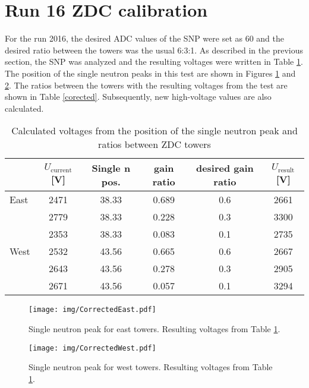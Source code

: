 \section{Run 16 ZDC calibration}
For the run 2016, the desired ADC values of the SNP were set as 60 and the desired ratio between the
towers was the usual 6:3:1. As described in the previous section, the SNP was analyzed
and the resulting voltages were written in Table \ref{uncorected}. The position of the single
neutron peaks in this test
are shown in Figures \ref{eastPlot} and \ref{westPlot}.
The ratios between the towers with the resulting voltages from the test
are shown in Table \ref{corected}.
Subsequently, new high-voltage values are also calculated.

\begin{table}[htb] 
\caption{Calculated voltages from the position of the single neutron peak and ratios 
between ZDC towers}
\label{uncorected}
\begin{center}
\begin{tabular}{lccccc}
 \toprule
 &$U_\text{current}$[V]&Single n pos.&gain ratio&desired gain ratio&$U_\text{result}$[V]\\
\midrule
 East&2471&38.33&0.689&0.6&2661\\
     &2779&38.33&0.228&0.3&3300\\
     &2353&38.33&0.083&0.1&2735\\
 \midrule
West&2532&43.56&0.665&0.6&2667\\
    &2643&43.56&0.278&0.3&2905\\
    &2671&43.56&0.057&0.1&3294\\
 \bottomrule
\end{tabular}
\end{center}
\end{table}

\begin{figure}[htb]
\begin{center}
\texttt{[image: img/CorrectedEast.pdf]}
\end{center}
\caption{Single neutron peak for east towers. Resulting voltages from Table \ref{uncorected}.}
\label{eastPlot}
\end{figure}

\begin{figure}[htb]
\begin{center}
\texttt{[image: img/CorrectedWest.pdf]}
\end{center}
\caption{Single neutron peak for west towers. Resulting voltages from Table \ref{uncorected}.}
\label{westPlot}
\end{figure}

